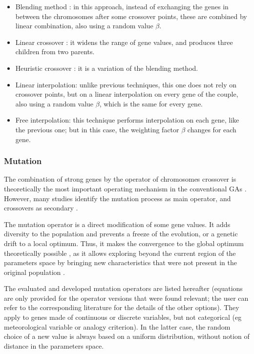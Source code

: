\documentclass{ametsoc}
\begin{document}
\begin{itemize}
	\item Blending method \citep{Radcliffe1991a}: in this approach, instead of exchanging the genes in between the chromosomes after some crossover points, these are combined by linear combination, also using a random value $\beta$.
	
	\item Linear crossover \citep{Wright1991a}: it widens the range of gene values, and produces three children from two parents.
	
	\item Heuristic crossover \citep{Michalewicz1996}: it is a variation of the blending method.
	
	\item Linear interpolation: unlike previous techniques, this one does not rely on crossover points, but on a linear interpolation on every gene of the couple, also using a random value $\beta$, which is the same for every gene.
	
	\item Free interpolation: this technique performs interpolation on each gene, like the previous one; but in this case, the weighting factor $\beta$ changes for each gene.
	
\end{itemize}


\subsubsection{Mutation}
\label{sec:gas:mutation}

The combination of strong genes by the operator of chromosomes crossover is theoretically the most important operating mechanism in the conventional GAs \citep{Holland1992b,Back1993b}. However, many studies identify the mutation process as main operator, and crossovers as secondary \citep[see][]{Back1992a, Back1996a, Back1996b, Smith1997a, Deb1999, Costa2005a, Costa2007a}.

The mutation operator is a direct modification of some gene values. It adds diversity to the population and prevents a freeze of the evolution, or a genetic drift to a local optimum. Thus, it makes the convergence to the global optimum theoretically possible \citep{Beasley1993a}, as it allows exploring beyond the current region of the parameters space by bringing new characteristics that were not present in the original population \citep{Haupt2004}. 

The evaluated and developed mutation operators are listed hereafter (equations are only provided for the operator versions that were found relevant; the user can refer to the corresponding literature for the details of the other options). They apply to genes made of continuous or discrete variables, but not categorical (eg meteorological variable or analogy criterion). In the latter case, the random choice of a new value is always based on a uniform distribution, without notion of distance in the parameters space.
\end{document}
